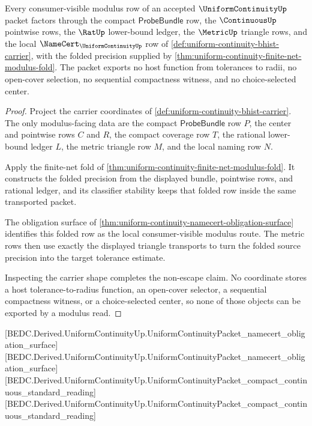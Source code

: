 \begin{theorem}
\label{thm:uniform-continuity-modulus-non-escape}
Every consumer-visible modulus row of an accepted $\UniformContinuityUp$
packet factors through the compact $\mathsf{ProbeBundle}$ row, the
$\ContinuousUp$ pointwise rows, the $\RatUp$ lower-bound ledger, the
$\MetricUp$ triangle rows, and the local $\NameCert_{\UniformContinuityUp}$
row of \autoref{def:uniform-continuity-bhist-carrier}, with the folded
precision supplied by \autoref{thm:uniform-continuity-finite-net-modulus-fold}.
The packet exports no host function from tolerances to radii, no open-cover
selection, no sequential compactness witness, and no choice-selected center.
\end{theorem}
\begin{proof}
Project the carrier coordinates of
\autoref{def:uniform-continuity-bhist-carrier}. The only modulus-facing data
are the compact $\mathsf{ProbeBundle}$ row $P$, the center and pointwise rows
$C$ and $R$, the compact coverage row $T$, the rational lower-bound ledger
$L$, the metric triangle row $M$, and the local naming row $N$.

Apply the finite-net fold of
\autoref{thm:uniform-continuity-finite-net-modulus-fold}. It constructs the
folded precision from the displayed bundle, pointwise rows, and rational
ledger, and its classifier stability keeps that folded row inside the same
transported packet.

The obligation surface of
\autoref{thm:uniform-continuity-namecert-obligation-surface} identifies this
folded row as the local consumer-visible modulus route. The metric rows then
use exactly the displayed triangle transports to turn the folded source
precision into the target tolerance estimate.

Inspecting the carrier shape completes the non-escape claim. No coordinate
stores a host tolerance-to-radius function, an open-cover selector, a
sequential compactness witness, or a choice-selected center, so none of those
objects can be exported by a modulus read.
\end{proof}

[BEDC.Derived.UniformContinuityUp.UniformContinuityPacket\_namecert\_obligation\_surface]
[BEDC.Derived.UniformContinuityUp.UniformContinuityPacket\_namecert\_obligation\_surface]
[BEDC.Derived.UniformContinuityUp.UniformContinuityPacket\_compact\_continuous\_standard\_reading]
[BEDC.Derived.UniformContinuityUp.UniformContinuityPacket\_compact\_continuous\_standard\_reading]

